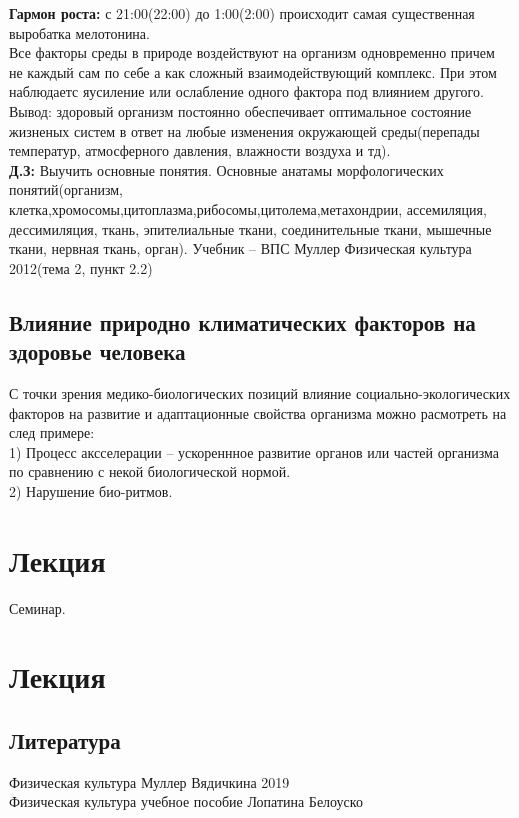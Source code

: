 \documentclass[a4paper, 12pt]{article}
\begin{document}
\textbf{Гармон роста:} с 21:00(22:00) до 1:00(2:00) происходит самая существенная выробатка мелотонина.\\

Все факторы среды в природе воздействуют на организм одновременно причем не каждый сам по себе а как сложный взаимодействующий комплекс. При этом наблюдаетс яусиление или ослабление одного фактора под влиянием другого.\\

Вывод: здоровый организм постоянно обеспечивает оптимальное состояние жизненых систем в ответ на любые изменения окружающей среды(перепады температур, атмосферного давления, влажности воздуха и тд).\\

\textbf{Д.З:}
 Выучить основные понятия. Основные анатамы морфологических понятий(организм, клетка,хромосомы,цитоплазма,рибосомы,цитолема,метахондрии, ассемиляция, дессимиляция, ткань, эпителиальные ткани, соединительные ткани, мышечные ткани, нервная ткань, орган). Учебник -- ВПС Муллер Физическая культура 2012(тема 2, пункт 2.2)\\

\subsection{Влияние природно климатических факторов на здоровье человека}

С точки зрения медико-биологических позиций влияние социально-экологических факторов на развитие и адаптационные свойства организма можно расмотреть на след примере:\\
1) Процесс аксселерации -- ускореннное развитие органов или частей организма по сравнению с некой биологической нормой.\\
2) Нарушение био-ритмов.\\



\section{Лекция}

Семинар.\\

\section{Лекция}










\newpage
\subsection*{Литература} 
Физическая культура Муллер Вядичкина 2019\\
Физическая культура учебное пособие Лопатина Белоуско \\ 
\end{document}
